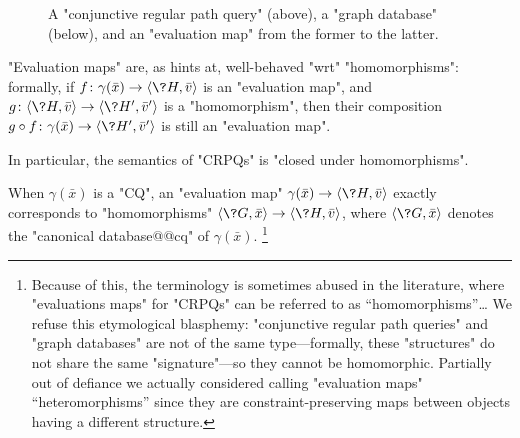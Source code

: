 \begin{figure}
    \centering
    \caption{\AP\label{fig:prelim-db-evaluation-map} A "conjunctive regular path query" (above), 
    a "graph database" (below), and an "evaluation map" from the former
    to the latter.}
\end{figure}
"Evaluation maps" are, as  hints at,
well-behaved "wrt" "homomorphisms": formally, if
$f\colon \gamma(\bar x) \to \tup{\?H, \bar v}$ is an "evaluation map",
and $g\colon \tup{\?H, \bar v} \to \tup{\?H', \bar v'}$ is a "homomorphism",
then their composition $g\circ f\colon \gamma(\bar x) \to \tup{\?H', \bar v'}$ is still
an "evaluation map".%
\begin{fact}
    \AP\label{fact:prelim-db-crpq-closed-under-hom}
    In particular, the semantics of "CRPQs" is
    "closed under homomorphisms".
\end{fact}
When $\gamma(\bar x)$ is a "CQ", an "evaluation map" $\gamma(\bar x) \to \tup{\?H, \bar v}$
exactly corresponds to "homomorphisms" $\tup{\?G, \bar x} \to \tup{\?H, \bar v}$,
where $\tup{\?G, \bar x}$ denotes the "canonical database@@cq" of $\gamma(\bar x)$.%
\footnote{Because of this, the terminology is sometimes abused in the literature, where "evaluations maps" 
for "CRPQs" can be referred to as ``homomorphisms''…
We refuse this etymological blasphemy: "conjunctive 
regular path queries" and "graph databases" are not of the same type---formally, these "structures" do not share the same "signature"---so they cannot be homomorphic.
Partially out of defiance we actually considered calling "evaluation maps" ``heteromorphisms'' since they are constraint-preserving maps between objects having a different structure.}

